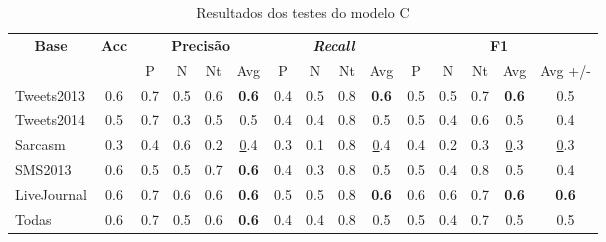 \documentclass[12pt]{article}
\begin{document}
\begin{table}[H]
\centering
\begin{adjustwidth}{-1cm}{}
\begin{tabular}{lcccccccccccccc}
\multicolumn{1}{c}{\textbf{Base}} & \textbf{Acc} & \multicolumn{4}{c}{\textbf{Precisão}} & \multicolumn{4}{c}{\textit{\textbf{Recall}}} & \multicolumn{5}{c}{\textbf{F1}} \\
 &  & \multicolumn{1}{c|}{P} & \multicolumn{1}{c|}{N} & \multicolumn{1}{c|}{Nt} & Avg & \multicolumn{1}{c|}{P} & \multicolumn{1}{c|}{N} & \multicolumn{1}{c|}{Nt} & Avg & \multicolumn{1}{c|}{P} & \multicolumn{1}{c|}{N} & \multicolumn{1}{c|}{Nt} & \multicolumn{1}{c|}{Avg} & Avg +/- \\
Tweets2013 & 0.6 & 0.7 & 0.5 & 0.6 & \textbf{0.6} & 0.4 & 0.5 & 0.8 & \textbf{0.6} & 0.5 & 0.5 & 0.7 & \textbf{0.6} & 0.5 \\ \hline
Tweets2014 & 0.5 & 0.7 & 0.3 & 0.5 & 0.5 & 0.4 & 0.4 & 0.8 & 0.5 & 0.5 & 0.4 & 0.6 & 0.5 & 0.4 \\ \hline
Sarcasm & 0.3 & 0.4 & 0.6 & 0.2 & {\ul 0.4} & 0.3 & 0.1 & 0.8 & {\ul 0.4} & 0.4 & 0.2 & 0.3 & {\ul 0.3} & {\ul 0.3} \\ \hline
SMS2013 & 0.6 & 0.5 & 0.5 & 0.7 & \textbf{0.6} & 0.4 & 0.3 & 0.8 & 0.5 & 0.5 & 0.4 & 0.8 & 0.5 & 0.4 \\ \hline
LiveJournal & 0.6 & 0.7 & 0.6 & 0.6 & \textbf{0.6} & 0.5 & 0.5 & 0.8 & \textbf{0.6} & 0.6 & 0.6 & 0.7 & \textbf{0.6} & \textbf{0.6} \\ \hline
Todas & 0.6 & 0.7 & 0.5 & 0.6 & \textbf{0.6} & 0.4 & 0.4 & 0.8 & 0.5 & 0.5 & 0.4 & 0.7 & 0.5 & 0.5 \\ \hline
\end{tabular}
\caption{Resultados dos testes do modelo C}
\label{test3}
\end{adjustwidth}
\end{table}
\end{document}
